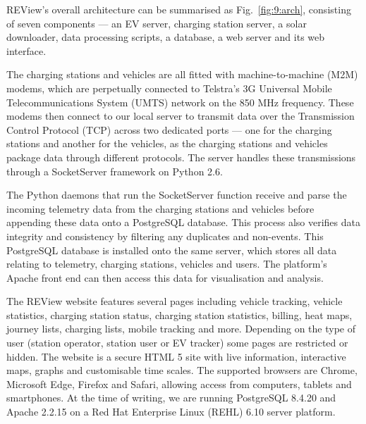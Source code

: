 REView’s overall architecture can be summarised as Fig.~\ref{fig:9:arch}, consisting of seven components --- an EV server, charging station server, a solar downloader, data processing scripts, a database, a web server and its web interface. 

The charging stations and vehicles are all fitted with machine-to-machine (M2M) modems, which are perpetually connected to Telstra’s 3G Universal Mobile Telecommunications System (UMTS) network on the 850 MHz frequency. These modems then connect to our local server to transmit data over the Transmission Control Protocol (TCP) across two dedicated ports --- one for the charging stations and another for the vehicles, as the charging stations and vehicles package data through different protocols. The server handles these transmissions through a SocketServer framework on Python 2.6.


The Python daemons that run the SocketServer function receive and parse the incoming telemetry data from the charging stations and vehicles before appending these data onto a PostgreSQL database. This process also verifies data integrity and consistency by filtering any duplicates and non-events. This PostgreSQL database is installed onto the same server, which stores all data relating to telemetry, charging stations, vehicles and users. The platform’s Apache front end can then access this data for visualisation and analysis. 

The REView website features several pages including vehicle tracking, vehicle statistics, charging station status, charging station statistics, billing, heat maps, journey lists, charging lists, mobile tracking and more. Depending on the type of user (station operator, station user or EV tracker) some pages are restricted or hidden. The website is a secure HTML 5 site with live information, interactive maps, graphs and customisable time scales. The supported browsers are Chrome, Microsoft Edge, Firefox and Safari, allowing access from computers, tablets and smartphones. At the time of writing, we are running PostgreSQL 8.4.20 and Apache 2.2.15 on a Red Hat Enterprise Linux (REHL) 6.10 server platform.


